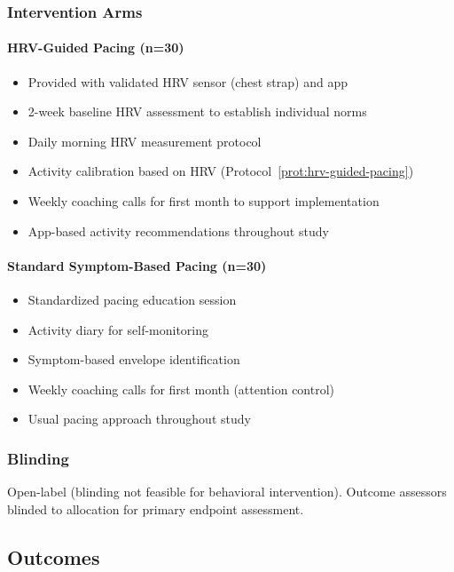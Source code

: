 \subsubsection{Intervention Arms}

\paragraph{HRV-Guided Pacing (n=30)}
\begin{itemize}
    \item Provided with validated HRV sensor (chest strap) and app
    \item 2-week baseline HRV assessment to establish individual norms
    \item Daily morning HRV measurement protocol
    \item Activity calibration based on HRV (Protocol~\ref{prot:hrv-guided-pacing})
    \item Weekly coaching calls for first month to support implementation
    \item App-based activity recommendations throughout study
\end{itemize}

\paragraph{Standard Symptom-Based Pacing (n=30)}
\begin{itemize}
    \item Standardized pacing education session
    \item Activity diary for self-monitoring
    \item Symptom-based envelope identification
    \item Weekly coaching calls for first month (attention control)
    \item Usual pacing approach throughout study
\end{itemize}

\subsubsection{Blinding}
Open-label (blinding not feasible for behavioral intervention). Outcome assessors blinded to allocation for primary endpoint assessment.

\subsection{Outcomes}

